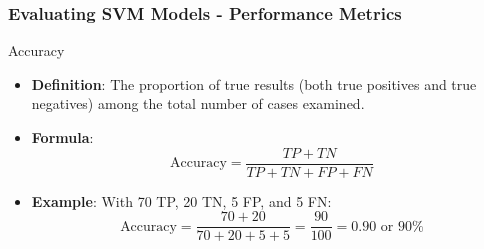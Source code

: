 \documentclass[aspectratio=169]{beamer}
\begin{document}
\begin{frame}[fragile]
    \frametitle{Evaluating SVM Models - Performance Metrics}
    \begin{block}{Accuracy}
        \begin{itemize}
            \item \textbf{Definition}: The proportion of true results (both true positives and true negatives) among the total number of cases examined.
            \item \textbf{Formula}:
            \begin{equation}
                \text{Accuracy} = \frac{TP + TN}{TP + TN + FP + FN}
            \end{equation}
            \item \textbf{Example}: With 70 TP, 20 TN, 5 FP, and 5 FN:
            \begin{equation}
                \text{Accuracy} = \frac{70 + 20}{70 + 20 + 5 + 5} = \frac{90}{100} = 0.90 \text{ or } 90\%
            \end{equation}
        \end{itemize}
    \end{block}
\end{frame}
\end{document}
